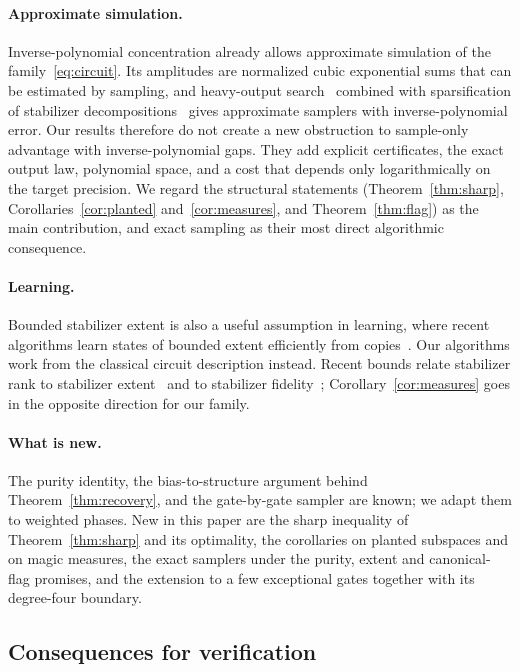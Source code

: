 \documentclass[a4paper,onecolumn,11pt,unpublished]{quantumarticle}
\theoremstyle{plain}
\theoremstyle{remark}
\begin{document}
\paragraph{Approximate simulation.}
Inverse-polynomial concentration already allows approximate simulation of the family~\eqref{eq:circuit}. Its amplitudes are normalized cubic exponential sums that can be estimated by sampling, and heavy-output search~\cite{SV13} combined with sparsification of stabilizer decompositions~\cite{BBC19} gives approximate samplers with inverse-polynomial error. Our results therefore do not create a new obstruction to sample-only advantage with inverse-polynomial gaps. They add explicit certificates, the exact output law, polynomial space, and a cost that depends only logarithmically on the target precision. We regard the structural statements (Theorem~\ref{thm:sharp}, Corollaries~\ref{cor:planted} and~\ref{cor:measures}, and Theorem~\ref{thm:flag}) as the main contribution, and exact sampling as their most direct algorithmic consequence.

\paragraph{Learning.}
Bounded stabilizer extent is also a useful assumption in learning, where recent algorithms learn states of bounded extent efficiently from copies~\cite{AD25,AD26,ADGG26}. Our algorithms work from the classical circuit description instead. Recent bounds relate stabilizer rank to stabilizer extent~\cite{SL26} and to stabilizer fidelity~\cite{MT24}; Corollary~\ref{cor:measures} goes in the opposite direction for our family.

\paragraph{What is new.}
The purity identity, the bias-to-structure argument behind Theorem~\ref{thm:recovery}, and the gate-by-gate sampler are known; we adapt them to weighted phases. New in this paper are the sharp inequality of Theorem~\ref{thm:sharp} and its optimality, the corollaries on planted subspaces and on magic measures, the exact samplers under the purity, extent and canonical-flag promises, and the extension to a few exceptional gates together with its degree-four boundary.

\subsection{Consequences for verification}
\end{document}
